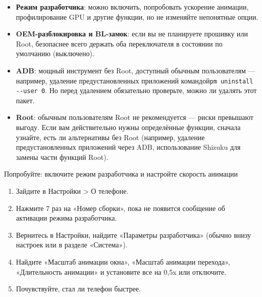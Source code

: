 
\begin{itemize}
  \item \textbf{Режим разработчика}: можно включить, попробовать ускорение анимации, профилирование GPU и другие функции, но не изменяйте непонятные опции.
  \item \textbf{OEM-разблокировка и BL-замок}: если вы не планируете прошивку или Root, безопаснее всего держать оба переключателя в состоянии по умолчанию (выключено).
  \item \textbf{ADB}: мощный инструмент без Root, доступный обычным пользователям — например, удаление предустановленных приложений командой\texttt{pm uninstall -\allowbreak -\allowbreak user 0}. Но перед удалением обязательно проверьте, можно ли удалять этот пакет.
  \item \textbf{Root}: обычным пользователям Root не рекомендуется — риски превышают выгоду. Если вам действительно нужны определённые функции, сначала узнайте, есть ли альтернативы без Root (например, удаление предустановленных приложений через ADB, использование Shizuku для замены части функций Root).
\end{itemize}

\begin{tcbpractice}{Попробуйте: включите режим разработчика и настройте скорость анимации}
\begin{enumerate}
  \item Зайдите в Настройки > О телефоне.
  \item Нажмите 7 раз на «Номер сборки», пока не появится сообщение об активации режима разработчика.
  \item Вернитесь в Настройки, найдите «Параметры разработчика» (обычно внизу настроек или в разделе «Система»).
  \item Найдите «Масштаб анимации окна», «Масштаб анимации перехода», «Длительность анимации» и установите все на 0,5x или отключите.
  \item Почувствуйте, стал ли телефон быстрее.
\end{enumerate}

\end{tcbpractice}
